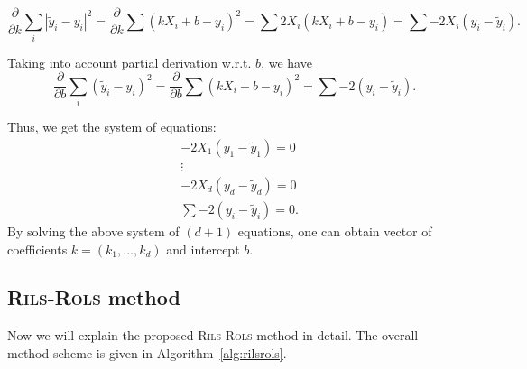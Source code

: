 \documentclass[a4paper,12pt]{elsarticle}
\begin{document}
	$$  \frac{\partial}{\partial k} \sum_{i} |\tilde{y}_i - y_i|^2 = \frac{\partial}{\partial k} \sum ( kX_i+b  - y_i)^2 =  \sum 2X_i(kX_i + b - y_i)  =  \sum -2X_i (y_i - \tilde{y}_i) . $$
  
	Taking into account   partial derivation w.r.t.  $b$, we have 
	$$  \frac{\partial}{\partial b} \sum_{i} (\tilde{y}_i - y_i)^2  = \frac{\partial}{\partial b} \sum ( kX_i+b  - y_i)^2 = \sum -2  (y_i - \tilde{y}_i). $$
	
	Thus, we get the system of equations: 
	\begin{align*}
		& -2X_1 (y_1 - \tilde{y}_1)  = 0 \\
		& \vdots \\
		& -2X_d (y_d - \tilde{y}_d)  = 0 \\
		&\sum -2  (y_i - \tilde{y}_i) = 0.
	\end{align*}
By solving the above system of $(d+1)$ equations, one can obtain vector of coefficients $k=(k_1, ..., k_d)$ and intercept $b$. %
\subsection{\textsc{Rils}-\textsc{Rols}  method}
Now we will explain the proposed \textsc{Rils}-\textsc{Rols}  method in detail. The overall method scheme is given in Algorithm~\ref{alg:rilsrols}.   
\end{document}
